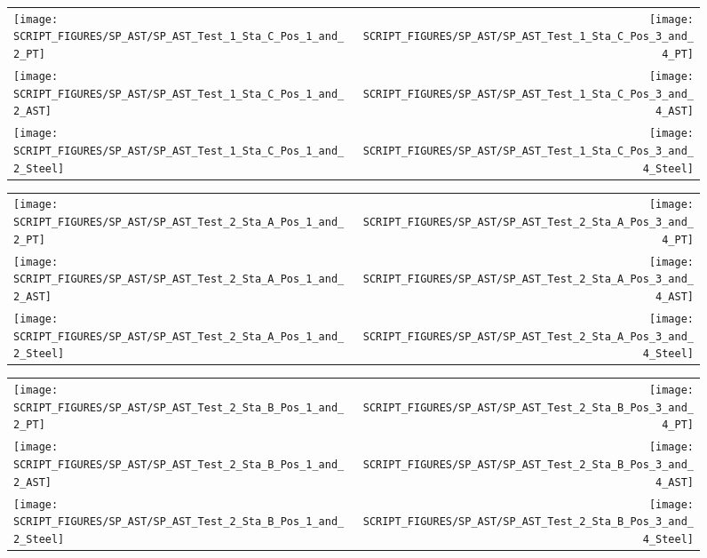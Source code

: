 \begin{figure}[!ht]
\begin{tabular*}{\textwidth}{l@{\extracolsep{\fill}}r}
\texttt{[image: SCRIPT\_FIGURES/SP\_AST/SP\_AST\_Test\_1\_Sta\_C\_Pos\_1\_and\_2\_PT]} &
\texttt{[image: SCRIPT\_FIGURES/SP\_AST/SP\_AST\_Test\_1\_Sta\_C\_Pos\_3\_and\_4\_PT]} \\
\texttt{[image: SCRIPT\_FIGURES/SP\_AST/SP\_AST\_Test\_1\_Sta\_C\_Pos\_1\_and\_2\_AST]} &
\texttt{[image: SCRIPT\_FIGURES/SP\_AST/SP\_AST\_Test\_1\_Sta\_C\_Pos\_3\_and\_4\_AST]} \\
\texttt{[image: SCRIPT\_FIGURES/SP\_AST/SP\_AST\_Test\_1\_Sta\_C\_Pos\_1\_and\_2\_Steel]} &
\texttt{[image: SCRIPT\_FIGURES/SP\_AST/SP\_AST\_Test\_1\_Sta\_C\_Pos\_3\_and\_4\_Steel]}
\end{tabular*}
\label{SP_Test_1_Station_C}
\end{figure}


\begin{figure}[!ht]
\begin{tabular*}{\textwidth}{l@{\extracolsep{\fill}}r}
\texttt{[image: SCRIPT\_FIGURES/SP\_AST/SP\_AST\_Test\_2\_Sta\_A\_Pos\_1\_and\_2\_PT]} &
\texttt{[image: SCRIPT\_FIGURES/SP\_AST/SP\_AST\_Test\_2\_Sta\_A\_Pos\_3\_and\_4\_PT]} \\
\texttt{[image: SCRIPT\_FIGURES/SP\_AST/SP\_AST\_Test\_2\_Sta\_A\_Pos\_1\_and\_2\_AST]} &
\texttt{[image: SCRIPT\_FIGURES/SP\_AST/SP\_AST\_Test\_2\_Sta\_A\_Pos\_3\_and\_4\_AST]} \\
\texttt{[image: SCRIPT\_FIGURES/SP\_AST/SP\_AST\_Test\_2\_Sta\_A\_Pos\_1\_and\_2\_Steel]} &
\texttt{[image: SCRIPT\_FIGURES/SP\_AST/SP\_AST\_Test\_2\_Sta\_A\_Pos\_3\_and\_4\_Steel]}
\end{tabular*}
\label{SP_Test_2_Station_A}
\end{figure}

\begin{figure}[!ht]
\begin{tabular*}{\textwidth}{l@{\extracolsep{\fill}}r}
\texttt{[image: SCRIPT\_FIGURES/SP\_AST/SP\_AST\_Test\_2\_Sta\_B\_Pos\_1\_and\_2\_PT]} &
\texttt{[image: SCRIPT\_FIGURES/SP\_AST/SP\_AST\_Test\_2\_Sta\_B\_Pos\_3\_and\_4\_PT]} \\
\texttt{[image: SCRIPT\_FIGURES/SP\_AST/SP\_AST\_Test\_2\_Sta\_B\_Pos\_1\_and\_2\_AST]} &
\texttt{[image: SCRIPT\_FIGURES/SP\_AST/SP\_AST\_Test\_2\_Sta\_B\_Pos\_3\_and\_4\_AST]} \\
\texttt{[image: SCRIPT\_FIGURES/SP\_AST/SP\_AST\_Test\_2\_Sta\_B\_Pos\_1\_and\_2\_Steel]} &
\texttt{[image: SCRIPT\_FIGURES/SP\_AST/SP\_AST\_Test\_2\_Sta\_B\_Pos\_3\_and\_4\_Steel]}
\end{tabular*}
\label{SP_Test_2_Station_B}
\end{figure}

